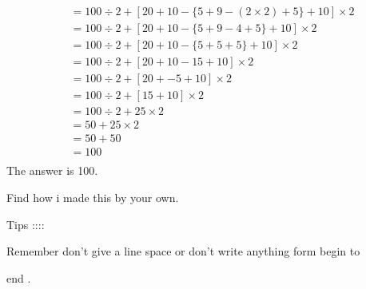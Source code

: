 \documentclass[11pt]{article}
\begin{document}
\begin{align*}
&=100\div2+[20+10-\{5+9-(2\times2)+5\}+10]\times2 \\
&=100\div2+[20+10-\{5+9-4+5\}+10]\times2 \\
&=100\div2+[20+10-\{5+5+5\}+10]\times2 \\
&=100\div2+[20+10-15+10]\times2 \\
&=100\div2+[20+-5+10]\times2 \\
&=100\div2+[15+10]\times2 \\
&=100\div2+25\times2 \\
&=50+25\times2 \\
&=50+50 \\
&=100 \\
\end{align*}
The answer is 100.

Find how i made this by your own.

Tips ::::

Remember don't give a line space or don't write anything form begin to 

end .
\end{document}
